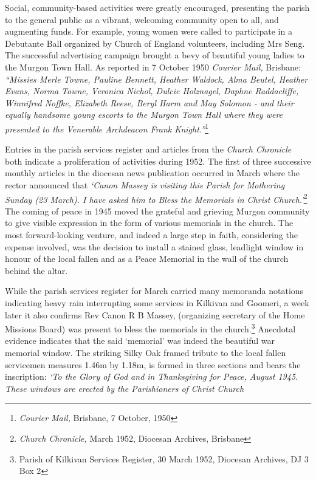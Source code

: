 Social, community-based activities were greatly encouraged, presenting the parish to the general public as a vibrant, welcoming community open to all, and augmenting funds. For example, young women were called to participate in a Debutante Ball organized by Church of England volunteers, including Mrs Seng. The successful advertising campaign brought a bevy of beautiful young ladies to the Murgon Town Hall. As reported in 7 October 1950 \emph{Courier Mail,} Brisbane: \emph{``Missies Merle Towne, Pauline Bennett, Heather Waldock, Alma Beutel, Heather Evans, Norma Towne, Veronica Nichol, Dulcie Holznagel, Daphne Raddacliffe, Winnifred Noffke, Elizabeth Reese, Beryl Harm and May Solomon - and their equally handsome young escorts to the Murgon Town Hall where they were presented to the Venerable Archdeacon Frank Knight.''}\footnote{\emph{Courier Mail,} Brisbane, 7 October, 1950}


Entries in the parish services register and articles from the \emph{Church Chronicle} both indicate a proliferation of activities during 1952. The first of three successive monthly articles in the diocesan news publication occurred in March where the rector announced that \emph{`Canon Massey is visiting this Parish for Mothering Sunday (23 March). I have asked him to Bless the Memorials in Christ Church.'}\footnote{\emph{Church Chronicle,} March 1952, Diocesan Archives, Brisbane} The coming of peace in 1945 moved the grateful and grieving Murgon community to give visible expression in the form of various memorials in the church. The most forward-looking venture, and indeed a large step in faith, considering the expense involved, was the decision to install a stained glass, leadlight window in honour of the local fallen and as a Peace Memorial in the wall of the church behind the altar.


While the parish services register for March carried many memoranda notations indicating heavy rain interrupting some services in Kilkivan and Goomeri, a week later it also confirms Rev Canon R B Massey, (organizing secretary of the Home Missions Board) was present to bless the memorials in the church.\footnote{Parish of Kilkivan Services Register, 30 March 1952, Diocesan Archives, DJ 3 Box 2} Anecdotal evidence indicates that the said `memorial' was indeed the beautiful war memorial window. The striking Silky Oak framed tribute to the local fallen servicemen measures 1.46m by 1.18m, is formed in three sections and bears the inscription: \emph{`To the Glory of God and in Thanksgiving for Peace, August 1945. These windows are erected by the Parishioners of Christ Church}


